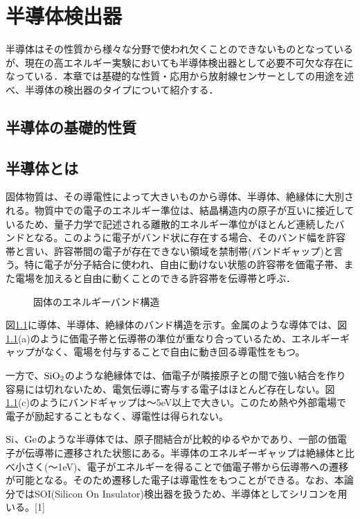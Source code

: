 \chapter{半導体検出器}
半導体はその性質から様々な分野で使われ欠くことのできないものとなっているが、現在の高エネルギー実験においても半導体検出器として必要不可欠な存在になっている．本章では基礎的な性質・応用から放射線センサーとしての用途を述べ、半導体の検出器のタイプについて紹介する．

\section{半導体の基礎的性質}
\section{半導体とは}
固体物質は、その導電性によって大きいものから導体、半導体、絶縁体に大別される。物質中での電子のエネルギー準位は、結晶構造内の原子が互いに接近しているため、量子力学で記述される離散的エネルギー準位がほとんど連続したバンドとなる。このように電子がバンド状に存在する場合、そのバンド幅を許容帯と言い、許容帯間の電子が存在できない領域を禁制帯(バンドギャップ)と言う。特に電子が分子結合に使われ、自由に動けない状態の許容帯を価電子帯、また電場を加えると自由に動くことのできる許容帯を伝導帯と呼ぶ．

\begin{figure}[!htbp]
\begin{center}
\end{center}
\caption{固体のエネルギーバンド構造}
\label{fig:バンド構造}
\end{figure}

 図\ref{fig:バンド構造}に導体、半導体、絶縁体のバンド構造を示す。金属のような導体では、図\ref{fig:バンド構造}(a)のように価電子帯と伝導帯の準位が重なり合っているため、エネルギーギャップがなく、電場を付与することで自由に動き回る導電性をもつ。

一方で、${\rm SiO_2}$のような絶縁体では、価電子が隣接原子との間で強い結合を作り容易には切れないため、電気伝導に寄与する電子はほとんど存在しない。図\ref{fig:バンド構造}(c)のようにバンドギャップは〜5eV以上で大きい。このため熱や外部電場で電子が励起することもなく、導電性は得られない。

${\rm Si}$、${\rm Ge}$のような半導体では、原子間結合が比較的ゆるやかであり、一部の価電子が伝導帯に遷移された状態にある。半導体のエネルギーギャップは絶縁体と比べ小さく(〜1eV)、電子がエネルギーを得ることで価電子帯から伝導帯への遷移が可能となる。そのため遷移した電子は導電性をもつことができる。なお、本論分ではSOI(Silicon On Insulator)検出器を扱うため、半導体としてシリコンを用いる。[1]



